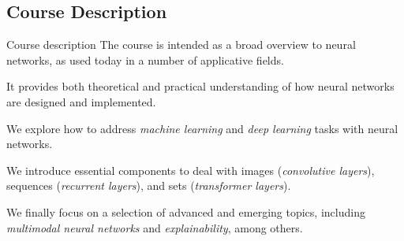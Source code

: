 \documentclass[xcolor=x11names,compress,10pt,unknownkeysallowed,aspectratio=169]{beamer}
\begin{document}
\subsection{Course Description}
\begin{frame}{Course description}
The course is intended as a \alert{broad overview to neural networks}, as used today in a number of applicative fields.

\vspace{0.6cm}
It provides both \alert{theoretical and practical understanding} of how neural networks are \linebreak designed and implemented.


\vspace{0.6cm}
We explore how to address \textit{machine learning} and \textit{deep learning} tasks with \alert{neural networks}.

\vspace{0.6cm}
We introduce \alert{essential components} to deal with images (\textit{convolutive layers}), sequences (\textit{recurrent layers}), and sets (\textit{transformer layers}).

\vspace{0.6cm}
We finally focus on a selection of \alert{advanced and emerging topics}, including \textit{multimodal neural networks} and \textit{explainability}, among others.
\end{frame}
%
\end{document}
